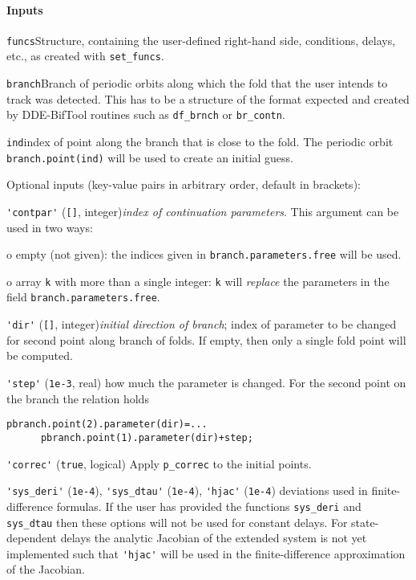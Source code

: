 \documentclass[11pt]{scrartcl}
\newcommand{\mlvar}[1]{\lstinline[keywordstyle=\color{var}]!#1!}
\newcommand{\blist}[1]{\mbox{\lstinline!#1!}}  \newlength{\tabw}
\begin{document}
\paragraph{Inputs}
\begin{compactitem}
\item \blist{funcs}\quad Structure, containing the user-defined right-hand
  side, conditions, delays, etc., as created with \blist{set_funcs}.
\item \blist{branch}\quad Branch of periodic orbits along which the
  fold that the user intends to track was detected. This has to be a
  structure of the format expected and created by DDE-BifTool routines
  such as \blist{df_brnch} or \blist{br_contn}.
\item \blist{ind}\quad index of point along the branch that is close
  to the fold. The periodic orbit \blist{branch.point(ind)} will be
  used to create an initial guess.
\item Optional inputs (key-value pairs in arbitrary order, default in
  brackets):
  \begin{compactitem}
  \item \blist{'contpar'} (\blist{[]}, integer)\quad \emph{index
    of continuation parameters}. This argument can be used in two
    ways:
    \begin{compactitem}
    \item[o] empty (not given): the indices given in
      \blist{branch.parameters.free} will be used.
    \item[o]  array \blist{k} with more than a single integer:  \blist{k}
    will \emph{replace} the parameters in the field
    \blist{branch.parameters.free}.
    \end{compactitem}
  \item \blist{'dir'} (\blist{[]}, integer)\quad \emph{initial direction of
      branch}; index of parameter to be changed for second point along
    branch of folds. If empty, then only a single fold point will be
    computed.
  \item \blist{'step'} (\blist{1e-3}, real) how much the parameter is
    changed. For the second point on the branch the relation holds
    \begin{lstlisting}
pbranch.point(2).parameter(dir)=...
      pbranch.point(1).parameter(dir)+step;
    \end{lstlisting}
  \item \blist{'correc'} (\blist{true}, logical) Apply
    \blist{p_correc} to the initial points.
  \item \blist{'sys_deri'} (\blist{1e-4}), \blist{'sys_dtau'}
    (\blist{1e-4}), \blist{'hjac'} (\blist{1e-4}) deviations used in
    finite-difference formulas. If the user has provided the functions
    \mlvar{sys_deri} and \mlvar{sys_dtau} then these options will not
    be used for constant delays. For state-dependent delays the
    analytic Jacobian of the extended system is not yet implemented
    such that \blist{'hjac'} will be used in the finite-difference
    approximation of the Jacobian.
  \end{compactitem}
\end{compactitem}
\end{document}
